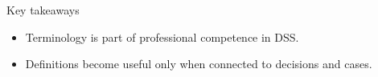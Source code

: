 \documentclass[aspectratio=169,11pt]{beamer}
\begin{document}

\begin{frame}{Key takeaways}
  \begin{itemize}
    \item Terminology is part of professional competence in DSS.
    \item Definitions become useful only when connected to decisions and cases.
  \end{itemize}
\end{frame}
\end{document}
